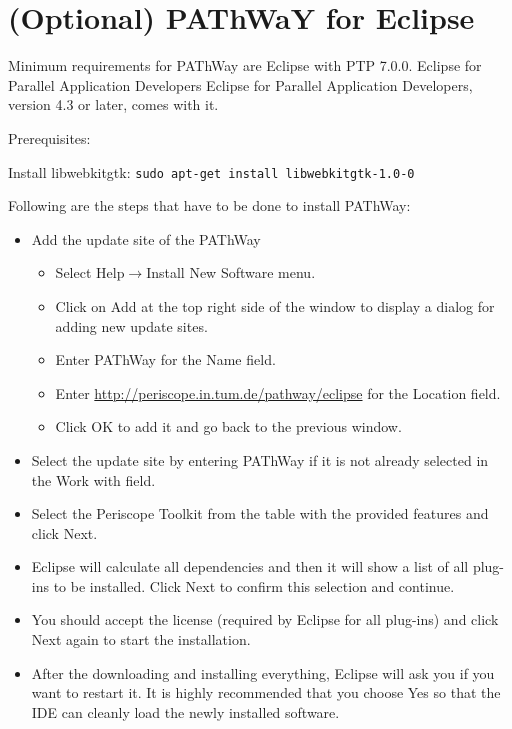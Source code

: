 \documentclass[11pt,a4paper, oneside]{book} %
\newcommand{\pathwayurl}{\url{http://periscope.in.tum.de/pathway/eclipse} }
\newcommand{\eclipseplugin}[3]{
Following are the steps that have to be done to install #1:
 \begin{itemize}
  \item Add the update site of the #1
  \begin{itemize}
   \item Select Help$\rightarrow$Install New Software menu.
   \item Click on Add at the top right side of the window to display a dialog
for adding new update sites.
  \item Enter #1 for the Name field.
  \item Enter #2 for the Location field.
  \item Click OK to add it and go back to the previous window.
  \end{itemize}
  \item Select the update site by entering #1 if it is not already selected in
the Work with field.
  \item Select the #3 from the table with the provided
features and click Next.
  \item Eclipse will calculate all dependencies and then it will show a list of
all plug-ins to be installed. Click Next to confirm this selection and continue.
  \item You should accept the license (required by Eclipse for all plug-ins) and
click Next again to start the installation.
  \item After the downloading and installing everything, Eclipse will ask you if
you want to restart it. It is highly recommended that you choose Yes so that the
IDE can cleanly load the newly installed software.
 \end{itemize}

}
\begin{document}
\section{(Optional) PAThWaY for Eclipse}
Minimum requirements for PAThWay are Eclipse with PTP 7.0.0. Eclipse for Parallel
Application Developers Eclipse for Parallel Application Developers, version 4.3
or later, comes with it.

Prerequisites:

Install libwebkitgtk: \texttt{sudo apt-get install libwebkitgtk-1.0-0}

\eclipseplugin{PAThWay}{\pathwayurl}{Periscope Toolkit}

\end{document}
